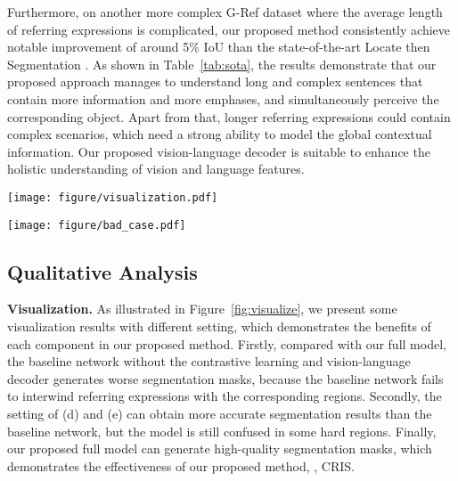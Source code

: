 \documentclass[10pt,twocolumn,letterpaper]{article}
\begin{document}
Furthermore, on another more complex G-Ref dataset where the average length of referring expressions is complicated, our proposed method consistently achieve notable improvement of around 5\% IoU than the state-of-the-art Locate then Segmentation \cite{jing2021locate}.
As shown in Table~\ref{tab:sota}, the results demonstrate that our proposed approach manages to understand long and complex sentences that contain more information and more emphases, and simultaneously perceive the corresponding object.
Apart from that, longer referring expressions could contain complex scenarios, which need a strong ability to model the global contextual information. Our proposed vision-language decoder is suitable to enhance the holistic understanding of vision and language features.

\begin{figure*}[t]
    \begin{center}
        \texttt{[image: figure/visualization.pdf]}
        \caption{\textbf{Qualitative examples with different settings.}
        (a) the input image.
        (b) the ground turth.
        (c) the baseline network.
        (d) CRIS without Vision-Language Decoder.
        (e) CRIS without Contrastive Learning.
        (f) our proposed CRIS.
        \textit{Best viewed in color.}}
    \label{fig:visualize}
    \end{center}
    \vspace{-7.0 mm}
\end{figure*}
\begin{figure*}[t]
    \begin{center}
        \texttt{[image: figure/bad\_case.pdf]}
        \caption{\textbf{Qualitative examples of failure cases.}
        \textit{Best viewed in color.}}
    \label{fig:bad_case}
    \end{center}
    \vspace{-7.0mm}
\end{figure*}

\subsection{Qualitative Analysis}
\textbf{Visualization.} As illustrated in Figure~\ref{fig:visualize}, we present some visualization results with different setting, which demonstrates the benefits of each component in our proposed method.
Firstly, compared with our full model, the baseline network without the contrastive learning and vision-language decoder generates worse segmentation masks, because the baseline network fails to interwind referring expressions with the corresponding regions.
Secondly, the setting of (d) and (e) can obtain more accurate segmentation results than the baseline network, but the model is still confused in some hard regions.
Finally, our proposed full model can generate high-quality segmentation masks, which demonstrates the effectiveness of our proposed method, \ie, CRIS.
\end{document}
